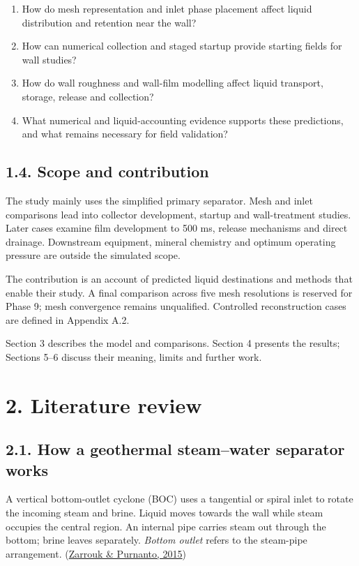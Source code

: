 \documentclass[
  12pt,
  a4paper,
]{article}
\providecommand{\tightlist}{%
  \setlength{\itemsep}{0pt}\setlength{\parskip}{0pt}}
\begin{document}
\begin{enumerate}
\def\labelenumi{\arabic{enumi}.}
\tightlist
\item
  How do mesh representation and inlet phase placement affect liquid
  distribution and retention near the wall?
\item
  How can numerical collection and staged startup provide starting
  fields for wall studies?
\item
  How do wall roughness and wall-film modelling affect liquid transport,
  storage, release and collection?
\item
  What numerical and liquid-accounting evidence supports these
  predictions, and what remains necessary for field validation?
\end{enumerate}

\subsection{1.4. Scope and contribution}\label{scope-and-contribution}

The study mainly uses the simplified primary separator. Mesh and inlet
comparisons lead into collector development, startup and wall-treatment
studies. Later cases examine film development to 500 ms, release
mechanisms and direct drainage. Downstream equipment, mineral chemistry
and optimum operating pressure are outside the simulated scope.

The contribution is an account of predicted liquid destinations and
methods that enable their study. A final comparison across five mesh
resolutions is reserved for Phase 9; mesh convergence remains
unqualified. Controlled reconstruction cases are defined in Appendix
A.2.

Section 3 describes the model and comparisons. Section 4 presents the
results; Sections 5--6 discuss their meaning, limits and further work.

\section{2. Literature review}\label{literature-review}

\subsection{2.1. How a geothermal steam--water separator
works}\label{how-a-geothermal-steamwater-separator-works}

A vertical bottom-outlet cyclone (BOC) uses a tangential or spiral inlet
to rotate the incoming steam and brine. Liquid moves towards the wall
while steam occupies the central region. An internal pipe carries steam
out through the bottom; brine leaves separately. \emph{Bottom outlet}
refers to the steam-pipe arrangement.
(\href{https://doi.org/10.1016/j.geothermics.2014.05.009}{Zarrouk \&
Purnanto, 2015})
\end{document}
